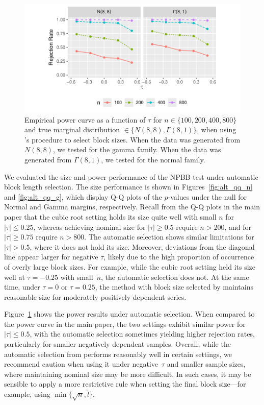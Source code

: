 \documentclass[12pt]{article}
\begin{document}
\begin{figure}[tbp]
  \centering
  \includegraphics[scale=1]{figures/alt_rr}
  \caption{Empirical power curve as a function of $\tau$ for
    $n \in \{100, 200, 400, 800\}$ and true marginal distribution
    $\in \{N(8,8), \Gamma(8,1)\}$, when using \citet{politis2004automatic}'s 
    procedure
    to select block sizes. When the data was generated from $N(8,8)$,
    we tested for the gamma family. When the data was generated from
    $\Gamma(8,1)$, we tested for the normal family.
  }
  \label{fig:alt_rr}
\end{figure}


We evaluated the size and power performance of the NPBB test under automatic
block length selection. The size performance is shown
in Figures~\ref{fig:alt_qq_n} and \ref{fig:alt_qq_g}, which display Q-Q plots
of the $p$-values under the null for Normal and Gamma margins, respectively.
Recall from the Q-Q plots in the main paper that the cubic root 
setting holds its size quite well with small $n$ for $|\tau| \leq 0.25$,
whereas achieving nominal size for $|\tau| \geq 0.5$ require
$n > 200$, and for $|\tau| \geq 0.75$ require $n > 800$. The automatic
selection shows similar limitations for $|\tau| > 0.5$, where it does
not hold its size. Moreover, deviations from the diagonal line appear
larger for negative $\tau$, likely due to the high proportion of
occurrence of overly large block sizes. For example, while the cubic
root setting held its size well at $\tau = -0.25$ with small~$n$, the
automatic selection does not. At the same time, under $\tau = 0$ or
$\tau = 0.25$, the method with block size selected by
\citet{politis2004automatic} maintains reasonable size for moderately
positively dependent series.


Figure~\ref{fig:alt_rr} shows the power results under automatic selection.
When compared to the power curve in the main paper, the two settings exhibit 
similar power
for $|\tau| \leq 0.5$, with the automatic selection sometimes yielding higher
rejection rates, particularly for smaller negatively dependent samples.
Overall, while the automatic selection from \citet{politis2004automatic}
performs reasonably well in certain settings, we recommend caution when using
it under negative~$\tau$ and smaller sample sizes, where maintaining nominal
size may be more difficult. In such cases, it may be sensible to apply a more
restrictive rule when setting the final block size---for example, using
$\min \{\sqrt{n}, \hat{l}\}$.




\end{document}
